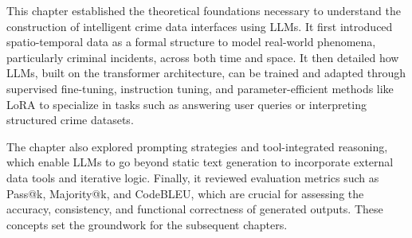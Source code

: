 This chapter established the theoretical foundations necessary to understand the construction of intelligent crime data interfaces using LLMs. It first introduced spatio-temporal data as a formal structure to model real-world phenomena, particularly criminal incidents, across both time and space. It then detailed how LLMs, built on the transformer architecture, can be trained and adapted through supervised fine-tuning, instruction tuning, and parameter-efficient methods like LoRA to specialize in tasks such as answering user queries or interpreting structured crime datasets.

The chapter also explored prompting strategies and tool-integrated reasoning, which enable LLMs to go beyond static text generation to incorporate external data tools and iterative logic. Finally, it reviewed evaluation metrics such as Pass@k, Majority@k, and CodeBLEU, which are crucial for assessing the accuracy, consistency, and functional correctness of generated outputs. These concepts set the groundwork for the subsequent chapters.